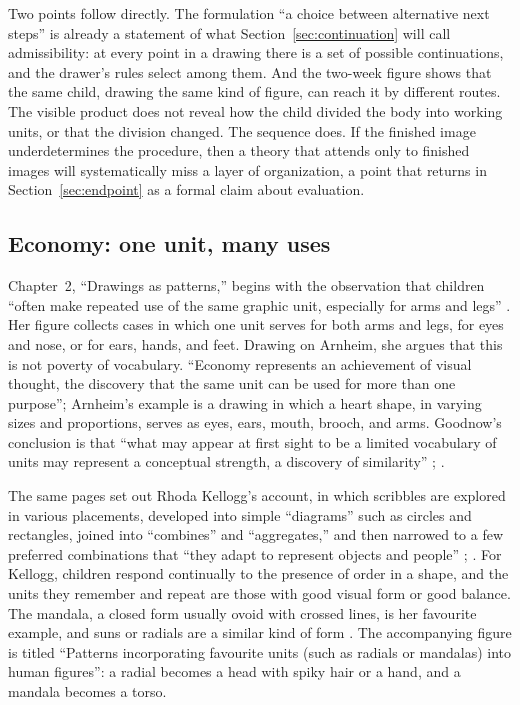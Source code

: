 \documentclass[11pt]{article}
\theoremstyle{remark}
\begin{document}
Two points follow directly. The formulation ``a choice between alternative next steps'' is already a statement of what Section~\ref{sec:continuation} will call admissibility: at every point in a drawing there is a set of possible continuations, and the drawer's rules select among them. And the two-week figure shows that the same child, drawing the same kind of figure, can reach it by different routes. The visible product does not reveal how the child divided the body into working units, or that the division changed. The sequence does. If the finished image underdetermines the procedure, then a theory that attends only to finished images will systematically miss a layer of organization, a point that returns in Section~\ref{sec:endpoint} as a formal claim about evaluation.

\subsection{Economy: one unit, many uses}

Chapter~2, ``Drawings as patterns,'' begins with the observation that children ``often make repeated use of the same graphic unit, especially for arms and legs'' \cite[p.~34]{goodnow1977}. Her figure collects cases in which one unit serves for both arms and legs, for eyes and nose, or for ears, hands, and feet. Drawing on Arnheim, she argues that this is not poverty of vocabulary. ``Economy represents an achievement of visual thought, the discovery that the same unit can be used for more than one purpose''; Arnheim's example is a drawing in which a heart shape, in varying sizes and proportions, serves as eyes, ears, mouth, brooch, and arms. Goodnow's conclusion is that ``what may appear at first sight to be a limited vocabulary of units may represent a conceptual strength, a discovery of similarity'' \cite[p.~35]{goodnow1977}; \cite{arnheim1954}.

The same pages set out Rhoda Kellogg's account, in which scribbles are explored in various placements, developed into simple ``diagrams'' such as circles and rectangles, joined into ``combines'' and ``aggregates,'' and then narrowed to a few preferred combinations that ``they adapt to represent objects and people'' \cite[p.~35]{goodnow1977}; \cite{kellogg1969}. For Kellogg, children respond continually to the presence of order in a shape, and the units they remember and repeat are those with good visual form or good balance. The mandala, a closed form usually ovoid with crossed lines, is her favourite example, and suns or radials are a similar kind of form \cite[p.~36]{goodnow1977}. The accompanying figure is titled ``Patterns incorporating favourite units (such as radials or mandalas) into human figures'': a radial becomes a head with spiky hair or a hand, and a mandala becomes a torso.
\end{document}
